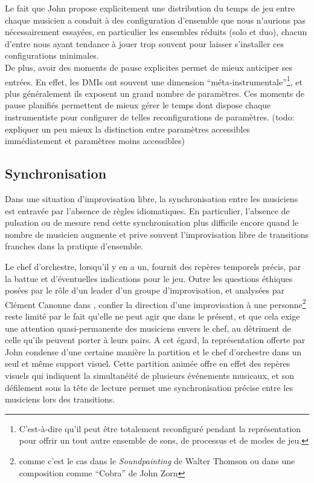 \noindent Le fait que John propose explicitement une distribution du temps de jeu entre chaque musicien a conduit à des configuration d'ensemble que nous n'aurions pas nécessairement essayées, en particulier les ensembles réduits (solo et duo), chacun d'entre nous ayant tendance à jouer trop souvent pour laisser s'installer ces configurations minimales.\\
\indent De plus, avoir des moments de pause explicites permet de mieux anticiper ses entrées. En effet, les \glspl{DMI} ont souvent une dimension ``méta-instrumentale''\footnote{C'est-à-dire qu'il peut être totalement reconfiguré pendant la représentation pour offrir un tout autre ensemble de sons, de processus et de modes de jeu.}, et plus généralement ils exposent un grand nombre de paramètres. Ces moments de pause planifiés permettent de mieux gérer le temps dont dispose chaque instrumentiste pour configurer de telles reconfigurations de paramètres. (todo: expliquer un peu mieux la distinction entre paramètres accessibles immédiatement et paramètres moins accessibles)

\subsection{Synchronisation}

\noindent Dans une situation d'improvisation libre, la synchronisation entre les musiciens est entravée par l'absence de règles idiomatiques. En particulier, l'absence de pulsation ou de mesure rend cette synchronisation plus difficile encore quand le nombre de musicien augmente et prive souvent l'improvisation libre de transitions franches dans la pratique d'ensemble.

\indent Le chef d'orchestre, lorsqu'il y en a un, fournit des repères temporels précis, par la battue et d'éventuelles indications pour le jeu. Outre les questions éthiques posées par le rôle d'un leader d'un groupe d'improvisation, et analysées par Clément Canonne dans \cite{canonne_improvisation_2012}, confier la direction d'une improvisation à une personne\footnote{comme c'est le cas dans le \textit{Soundpainting} de Walter Thomson ou dans une composition comme ``Cobra'' de John Zorn} reste limité par le fait qu'elle ne peut agir que dans le présent, et que cela exige une attention quasi-permanente des musiciens envers le chef, au détriment de celle qu'ils peuvent porter à leurs pairs. A cet égard, la représentation offerte par John condense d'une certaine manière la partition et le chef d'orchestre dans un seul et même support visuel. Cette partition animée offre en effet des repères visuels qui indiquent la simultanéité de plusieurs événements musicaux, et son défilement sous la tête de lecture permet une synchronisation précise entre les musiciens lors des transitions.\\

